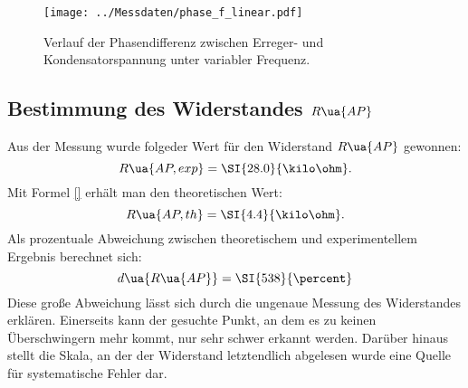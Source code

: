 \begin{figure}
  \centering
  \texttt{[image: ../Messdaten/phase\_f\_linear.pdf]}
  \caption{Verlauf der Phasendifferenz zwischen Erreger- und Kondensatorspannung unter variabler Frequenz.}
  \label{fig: phasenverlauf}
\end{figure}


\subsection{Bestimmung des Widerstandes $R\ua{AP}$}
Aus der Messung wurde folgeder Wert für den Widerstand $R\ua{AP}$ gewonnen:
\begin{equation}
  R\ua{AP, exp} = \SI{28.0}{\kilo\ohm}.
\end{equation}
Mit Formel \eqref{} erhält man den theoretischen Wert:
\begin{equation}
    R\ua{AP, th} = \SI{4.4}{\kilo\ohm}.
\end{equation}
Als prozentuale Abweichung zwischen theoretischem und experimentellem Ergebnis berechnet sich:
\begin{equation}
  d\ua{R\ua{AP}} = \SI{538}{\percent}
\end{equation}
Diese große Abweichung lässt sich durch die ungenaue Messung des Widerstandes erklären. Einerseits kann der gesuchte Punkt,
an dem es zu keinen Überschwingern mehr kommt, nur sehr schwer erkannt werden. Darüber hinaus stellt die Skala, an der der Widerstand
letztendlich abgelesen wurde eine Quelle für systematische Fehler dar.
